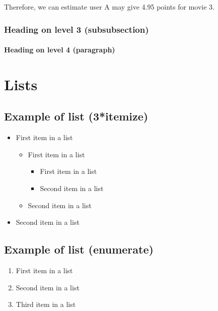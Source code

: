 \documentclass[paper=a4, fontsize=11pt]{scrartcl} %
\numberwithin{equation}{section} %
\numberwithin{figure}{section} %
\numberwithin{table}{section} %
\begin{document}
Therefore, we can estimate user A may give 4.95 points for movie 3. 



\subsubsection{Heading on level 3 (subsubsection)}

\lipsum[3] %

\paragraph{Heading on level 4 (paragraph)}

\lipsum[6] %


\section{Lists}


\subsection{Example of list (3*itemize)}
\begin{itemize}
	\item First item in a list
		\begin{itemize}
		\item First item in a list
			\begin{itemize}
			\item First item in a list
			\item Second item in a list
			\end{itemize}
		\item Second item in a list
		\end{itemize}
	\item Second item in a list
\end{itemize}


\subsection{Example of list (enumerate)}
\begin{enumerate}
\item First item in a list
\item Second item in a list
\item Third item in a list
\end{enumerate}

\end{document}
